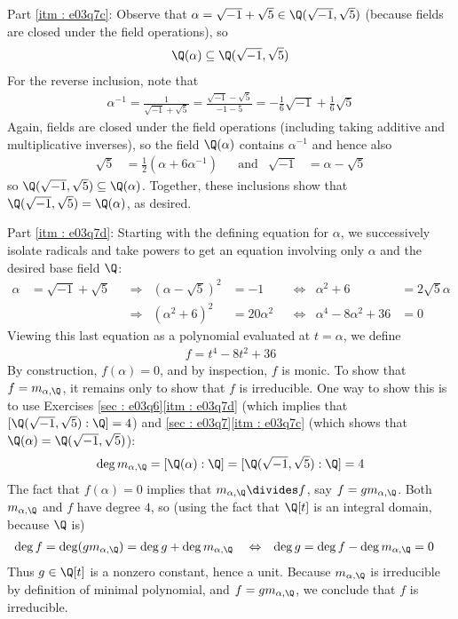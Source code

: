 {Part \ref{itm : e03q7c}: Observe that $\alpha = \sqrt{-1} + \sqrt{5} \in \Q(\sqrt{-1}, \sqrt{5})$ (because fields are closed under the field operations), so
\begin{align*}
\Q(\alpha)
\subseteq
\Q(\sqrt{-1}, \sqrt{5})
\end{align*}
For the reverse inclusion, note that
\begin{align*}
\alpha^{-1}
=
\frac{1}{\sqrt{-1} + \sqrt{5}}
=
\frac{\sqrt{-1} - \sqrt{5}}{-1 - 5}
=
-\frac{1}{6} \sqrt{-1} + \frac{1}{6} \sqrt{5}
\end{align*}
Again, fields are closed under the field operations (including taking additive and multiplicative inverses), so the field $\Q(\alpha)$ contains $\alpha^{-1}$ and hence also
\begin{align*}
\sqrt{5}
&=
\frac{1}{2} (\alpha + 6 \alpha^{-1})
&
&\text{and}
&
\sqrt{-1}
&=
\alpha - \sqrt{5}
\end{align*}
so $\Q(\sqrt{-1}, \sqrt{5}) \subseteq \Q(\alpha)$. Together, these inclusions show that $\Q(\sqrt{-1}, \sqrt{5}) = \Q(\alpha)$, as desired.

Part \ref{itm : e03q7d}: Starting with the defining equation for $\alpha$, we successively isolate radicals and take powers to get an equation involving only $\alpha$ and the desired base field $\Q$:
\begin{align*}
\alpha
&=
\sqrt{-1} + \sqrt{5}
&
&\Rightarrow
&
(\alpha - \sqrt{5})^{2}
&=
-1
&
&\Leftrightarrow
&
\alpha^{2} + 6
&=
2 \sqrt{5} \alpha
\\
&
&
&\Rightarrow
&
(\alpha^{2} + 6)^{2}
&=
20 \alpha^{2}
&
&\Leftrightarrow
&
\alpha^{4} - 8 \alpha^{2} + 36
&=
0
\end{align*}
Viewing this last equation as a polynomial evaluated at $t = \alpha$, we define
\begin{align*}
f
=
t^{4} - 8 t^{2} + 36
\end{align*}
By construction, $f(\alpha) = 0$, and by inspection, $f$ is monic. To show that $f = m_{\alpha, \Q}$, it remains only to show that $f$ is irreducible. One way to show this is to use Exercises \ref{sec : e03q6}\ref{itm : e03q7d} (which implies that $[\Q(\sqrt{-1}, \sqrt{5}) : \Q] = 4$) and \ref{sec : e03q7}\ref{itm : e03q7c} (which shows that $\Q(\alpha) = \Q(\sqrt{-1}, \sqrt{5})$):
\begin{align*}
\deg m_{\alpha, \Q}
=
[\Q(\alpha) : \Q]
=
[\Q(\sqrt{-1}, \sqrt{5}) : \Q]
=
4
\end{align*}
The fact that $f(\alpha) = 0$ implies that $m_{\alpha, \Q} \divides f$, say $f = g m_{\alpha, \Q}$. Both $m_{\alpha, \Q}$ and $f$ have degree $4$, so (using the fact that $\Q[t]$ is an integral domain, because $\Q$ is)
\begin{align*}
\deg f
&=
\deg(g m_{\alpha, \Q})
=
\deg g + \deg m_{\alpha, \Q}
&
&\Leftrightarrow
&
\deg g
&=
\deg f - \deg m_{\alpha, \Q}
=
0
\end{align*}
Thus $g \in \Q[t]$ is a nonzero constant, hence a unit. Because $m_{\alpha, \Q}$ is irreducible by definition of minimal polynomial, and $f = g m_{\alpha, \Q}$, we conclude that $f$ is irreducible.}%



